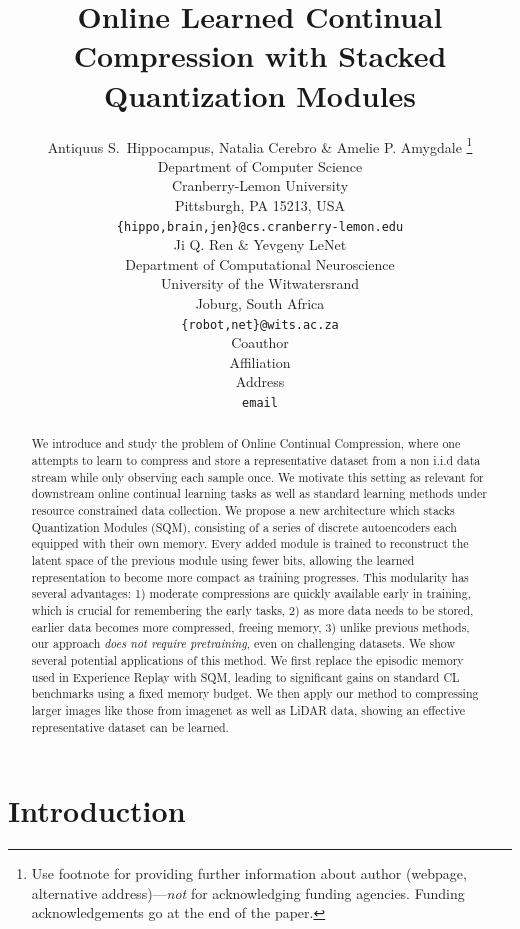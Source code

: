 \documentclass[colorinlistoftodos]{article} %
\title{Online Learned Continual Compression with Stacked Quantization Modules}
\author{Antiquus S.~Hippocampus, Natalia Cerebro \& Amelie P. Amygdale \thanks{ Use footnote for providing further information
about author (webpage, alternative address)---\emph{not} for acknowledging
funding agencies.  Funding acknowledgements go at the end of the paper.} \\
Department of Computer Science\\
Cranberry-Lemon University\\
Pittsburgh, PA 15213, USA \\
\texttt{\{hippo,brain,jen\}@cs.cranberry-lemon.edu} \\
\And
Ji Q. Ren \& Yevgeny LeNet \\
Department of Computational Neuroscience \\
University of the Witwatersrand \\
Joburg, South Africa \\
\texttt{\{robot,net\}@wits.ac.za} \\
\AND
Coauthor \\
Affiliation \\
Address \\
\texttt{email}
}
\begin{document}
\maketitle

\begin{abstract}

We introduce and study the problem of Online Continual Compression, where one attempts to learn to compress and store a representative dataset from a non i.i.d data stream while only observing each sample once. We motivate this setting as relevant for downstream online continual learning tasks as well as standard learning methods under resource constrained data collection. We propose a new architecture which stacks Quantization Modules (SQM), consisting of a series of discrete autoencoders each equipped with their own memory. Every added module is trained to reconstruct the latent space of the previous module using fewer bits, allowing the learned representation to become more compact as training progresses. This modularity has several advantages: 1) moderate compressions are quickly available early in training, which is crucial for remembering the early tasks, 2) as more data needs to be stored, earlier data becomes more compressed, freeing memory, 3) unlike previous methods, our approach \textit{does not require pretraining}, even on challenging datasets. We show several potential applications of this method. We first replace the episodic memory used in Experience Replay with SQM, leading to significant gains on standard CL benchmarks using a fixed memory budget. We then apply our method to compressing larger images like those from imagenet as well as LiDAR data, showing an effective representative dataset can be learned.

\end{abstract}


\section{Introduction}
\end{document}
